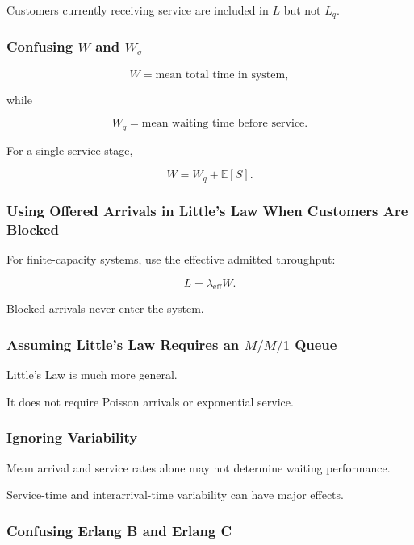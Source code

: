 Customers currently receiving service are included in \(L\) but not
\(L_q\).

\subsubsection{Confusing \(W\) and \(W_q\)}

\[
W
=
\text{mean total time in system},
\]

while

\[
W_q
=
\text{mean waiting time before service}.
\]

For a single service stage,

\[
\boxed{
W
=
W_q+\mathbb{E}[S].
}
\]

\subsubsection{Using Offered Arrivals in Little's Law When Customers Are Blocked}

For finite-capacity systems, use the effective admitted throughput:

\[
\boxed{
L
=
\lambda_{\mathrm{eff}}W.
}
\]

Blocked arrivals never enter the system.

\subsubsection{Assuming Little's Law Requires an \(M/M/1\) Queue}

Little's Law is much more general.

It does not require Poisson arrivals or exponential service.

\subsubsection{Ignoring Variability}

Mean arrival and service rates alone may not determine waiting performance.

Service-time and interarrival-time variability can have major effects.

\subsubsection{Confusing Erlang B and Erlang C}


